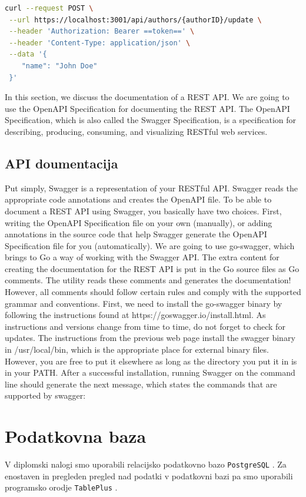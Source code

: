 \documentclass[a4paper, 12pt]{book}
\begin{document}
\begin{lstlisting}[language=bash, style=mystyle]
 curl --request POST \
 --url https://localhost:3001/api/authors/{authorID}/update \
 --header 'Authorization: Bearer ==token==' \
 --header 'Content-Type: application/json' \
 --data '{
    "name": "John Doe"
 }'
\end{lstlisting}
In this section, we discuss the documentation of a REST API. We are going to use the OpenAPI Specification for documenting the REST API. The OpenAPI Specification, which is also called the Swagger Specification, is a specification for describing, producing, consuming, and visualizing RESTful web services.
 
\subsection{API doumentacija}
Put simply, Swagger is a representation of your RESTful API. Swagger reads the appropriate code annotations and creates the OpenAPI file. To be able to document a REST API using Swagger, you basically have two choices. First, writing the OpenAPI Specification file on your own (manually), or adding annotations in the source code that help Swagger generate the OpenAPI Specification file for you (automatically).
We are going to use go-swagger, which brings to Go a way of working with the Swagger API. The extra content for creating the documentation for the REST API is put in the Go source files as Go comments. The utility reads these comments and generates the documentation! However, all comments should follow certain rules and comply with the supported grammar and conventions.
First, we need to install the go-swagger binary by following the instructions found at https://goswagger.io/install.html. As instructions and versions change from time to time, do not forget to check for updates. The instructions from the previous web page install the swagger binary in /usr/local/bin, which is the appropriate place for external binary files. However, you are free to put it elsewhere as long as the directory you put it in is in your PATH. After a successful installation, running Swagger on the command line should generate the next message, which states the commands that are supported by swagger:


\section{Podatkovna baza}
V diplomski nalogi smo uporabili relacijsko podatkovno bazo \verb=PostgreSQL= \cite{pg-database}. Za enostaven in pregleden pregled nad podatki v podatkovni bazi pa smo uporabili programsko orodje \verb=TablePlus= \cite{pg-database-client}.
\end{document}
